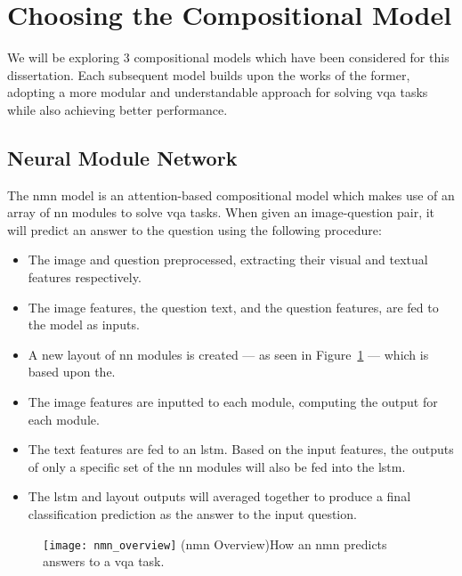 \graphicspath{{content/chapters/literature_review/choosing_the_compositional_model/figures}}

\section{Choosing the Compositional Model}
\label{sec:choosing_the_compositional_model}

We will be exploring 3 compositional models which have been considered for this dissertation.
Each subsequent model builds upon the works of the former, adopting a more modular and understandable approach for solving \gls{vqa} tasks while also achieving better performance.

\subsection{Neural Module Network}
\label{subsec:neural_module_network}

The \gls{nmn} model\cite{andreas_neural_2016} is an attention-based compositional model which makes use of an array of \gls{nn} modules to solve \gls{vqa} tasks.
When given an image-question pair, it will predict an answer to the question using the following procedure:

\begin{itemize}\label{list:nmn_procedure}
    \item The image and question preprocessed, extracting their visual and textual features respectively.
    \item The image features, the question text, and the question features, are fed to the model as inputs.
    \item A new layout of \gls{nn} modules is created --- as seen in Figure~\ref{fig:nmn_overview} --- which is based upon the.
    \item The image features are inputted to each module, computing the output for each module.
    \item The text features are fed to an \acrshort{lstm}. Based on the input features, the outputs of only a specific set of the \gls{nn} modules will also be fed into the \acrshort{lstm}.
    \item The \gls{lstm} and layout outputs will averaged together to produce a final classification prediction as the answer to the input question.
\end{itemize}

\begin{figure}[htbp]
    \centering
    \texttt{[image: nmn\_overview]}
    \captionsource(\acrshort{nmn} Overview){How an \acrshort{nmn} predicts answers to a \acrshort{vqa} task. \label{fig:nmn_overview}}{\citeauthor{andreas_deep_2016}\cite{andreas_deep_2016}}
\end{figure}

